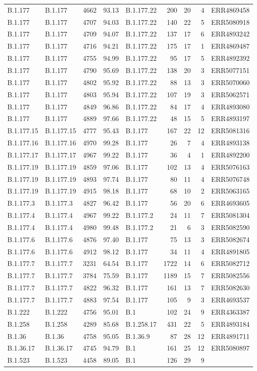 \documentclass[
]{article}
\begin{document}
\begin{longtable}[]{@{}llrrlrrrl@{}}
B.1.177 & B.1.177 & 4662 & 93.13 & B.1.177.22 & 200 & 20 & 4 &
ERR4869458\tabularnewline
B.1.177 & B.1.177 & 4707 & 94.03 & B.1.177.22 & 140 & 22 & 5 &
ERR5080918\tabularnewline
B.1.177 & B.1.177 & 4709 & 94.07 & B.1.177.22 & 137 & 17 & 6 &
ERR4893242\tabularnewline
B.1.177 & B.1.177 & 4716 & 94.21 & B.1.177.22 & 175 & 17 & 1 &
ERR4869487\tabularnewline
B.1.177 & B.1.177 & 4755 & 94.99 & B.1.177.22 & 95 & 17 & 5 &
ERR4892392\tabularnewline
B.1.177 & B.1.177 & 4790 & 95.69 & B.1.177.22 & 138 & 20 & 3 &
ERR5077151\tabularnewline
B.1.177 & B.1.177 & 4802 & 95.92 & B.1.177.22 & 88 & 13 & 3 &
ERR5070060\tabularnewline
B.1.177 & B.1.177 & 4803 & 95.94 & B.1.177.22 & 107 & 19 & 3 &
ERR5062571\tabularnewline
B.1.177 & B.1.177 & 4849 & 96.86 & B.1.177.22 & 84 & 17 & 4 &
ERR4893080\tabularnewline
B.1.177 & B.1.177 & 4889 & 97.66 & B.1.177.22 & 48 & 15 & 5 &
ERR4893197\tabularnewline
B.1.177.15 & B.1.177.15 & 4777 & 95.43 & B.1.177 & 167 & 22 & 12 &
ERR5081316\tabularnewline
B.1.177.16 & B.1.177.16 & 4970 & 99.28 & B.1.177 & 26 & 7 & 4 &
ERR4893138\tabularnewline
B.1.177.17 & B.1.177.17 & 4967 & 99.22 & B.1.177 & 36 & 4 & 1 &
ERR4892200\tabularnewline
B.1.177.19 & B.1.177.19 & 4859 & 97.06 & B.1.177 & 102 & 13 & 4 &
ERR5076163\tabularnewline
B.1.177.19 & B.1.177.19 & 4893 & 97.74 & B.1.177 & 80 & 11 & 4 &
ERR5076748\tabularnewline
B.1.177.19 & B.1.177.19 & 4915 & 98.18 & B.1.177 & 68 & 10 & 2 &
ERR5063165\tabularnewline
B.1.177.3 & B.1.177.3 & 4827 & 96.42 & B.1.177 & 56 & 20 & 6 &
ERR4693605\tabularnewline
B.1.177.4 & B.1.177.4 & 4967 & 99.22 & B.1.177.2 & 24 & 11 & 7 &
ERR5081304\tabularnewline
B.1.177.4 & B.1.177.4 & 4980 & 99.48 & B.1.177.2 & 21 & 6 & 3 &
ERR5082590\tabularnewline
B.1.177.6 & B.1.177.6 & 4876 & 97.40 & B.1.177 & 75 & 13 & 3 &
ERR5082674\tabularnewline
B.1.177.6 & B.1.177.6 & 4912 & 98.12 & B.1.177 & 34 & 11 & 4 &
ERR4891805\tabularnewline
B.1.177.7 & B.1.177.7 & 3231 & 64.54 & B.1.177 & 1722 & 14 & 6 &
ERR5082712\tabularnewline
B.1.177.7 & B.1.177.7 & 3784 & 75.59 & B.1.177 & 1189 & 15 & 7 &
ERR5082556\tabularnewline
B.1.177.7 & B.1.177.7 & 4822 & 96.32 & B.1.177 & 161 & 13 & 7 &
ERR5082630\tabularnewline
B.1.177.7 & B.1.177.7 & 4883 & 97.54 & B.1.177 & 105 & 9 & 3 &
ERR4693537\tabularnewline
B.1.222 & B.1.222 & 4756 & 95.01 & B.1 & 102 & 24 & 9 &
ERR4363387\tabularnewline
B.1.258 & B.1.258 & 4289 & 85.68 & B.1.258.17 & 431 & 22 & 5 &
ERR4893184\tabularnewline
B.1.36 & B.1.36 & 4758 & 95.05 & B.1.36.9 & 87 & 28 & 12 &
ERR4891711\tabularnewline
B.1.36.17 & B.1.36.17 & 4745 & 94.79 & B.1 & 161 & 25 & 12 &
ERR5080897\tabularnewline
B.1.523 & B.1.523 & 4458 & 89.05 & B.1 & 126 & 29 & 9 &

\end{longtable}
\end{document}

